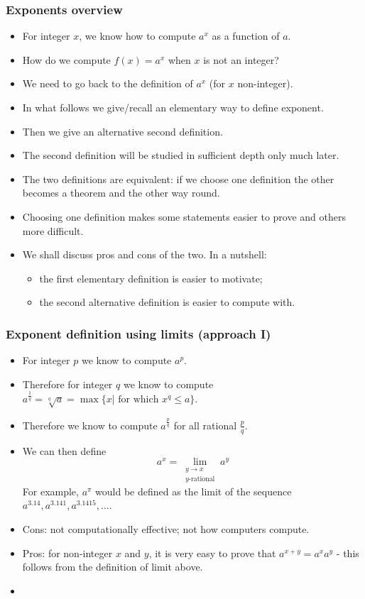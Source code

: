 \begin{frame}
\frametitle{Exponents overview}
\begin{itemize}
\item<1-> For integer $x$, we know how to compute $a^{x}$ as a function of $a$. 
\item<2-> How do we compute $f(x)=a^x$ when $x$ is not an integer?
\item<3-> We need to go back to the definition of $a^x$ (for $x$ non-integer).
\item<4-> In what follows we give/recall an elementary way to define exponent.
\item<5-> Then we give an alternative second definition. 
\item<6-> The second definition will be studied in sufficient depth only much later. 
\item<7-> The two definitions are equivalent: if we choose one definition the other becomes a theorem and the other way round.
\item<8-> Choosing one definition makes some statements easier to prove and others more difficult.
\item<9-> We shall discuss pros and cons of the two. In a nutshell: 
\begin{itemize}
\item<10-> the first elementary definition is easier to motivate;
\item<11-> the second alternative definition is easier to compute with.
\end{itemize}
\end{itemize}
\end{frame}
\begin{frame}
\frametitle{Exponent definition using limits (approach I)}
\begin{itemize}
\item<1-> For integer $p$ we know to compute $a^p$.
\item<2-> Therefore for integer $q$ we know to compute $a^{\frac{1}{q}}= \sqrt[q]{a}=\max\{x|\text{~for~which~} x^q\leq a\}$.
\item<3-> Therefore we know to compute $a^{\frac{p}{q}}$ for all rational $\frac{p}{q}$.
\item<4-> We can then define
\[
a^x = \lim\limits_{\substack{y \to x \\ y\text{-rational}}} a^y 
\]
For example, $a^\pi$ would be defined as the limit of the sequence $a^{3.14}, a^{3.141}, a^{3.1415}, \dots$.
\item<5-> Cons: not computationally effective; not how computers compute.
\item<6-> Pros: for non-integer $x$ and $y$, it is very easy to prove that $a^{x+y}=a^xa^y$ - this follows from the definition of limit above.
\item<7->
\end{itemize}
\end{frame}
